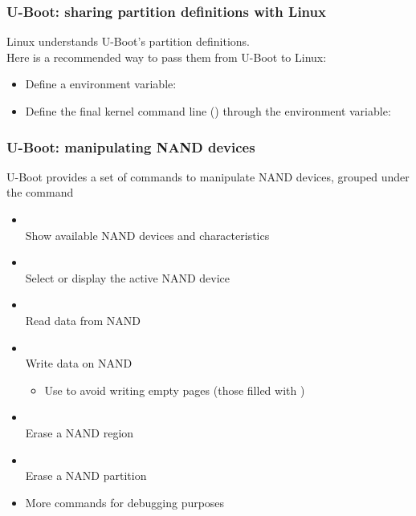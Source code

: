 \begin{frame}
  \frametitle{U-Boot: sharing partition definitions with Linux}
  Linux understands U-Boot's  partition definitions.\\
  Here is a recommended way to pass them from U-Boot to Linux:
  \begin{itemize}
  \item Define a  environment variable:\\
  \item Define the final kernel command line ()
    through the  environment variable:
  \end{itemize}
\end{frame}

\begin{frame}
  \frametitle{U-Boot: manipulating NAND devices}
  U-Boot provides a set of commands to manipulate NAND devices,
  grouped under the  command
  \begin{itemize}
  \item {}\\
    Show available NAND devices and characteristics
  \item {}\\
    Select or display the active NAND device
  \item {}\\
    Read data from NAND
  \item {}\\
    Write data on NAND
    \begin{itemize}
      \item Use  to avoid writing empty pages
      (those filled with )
    \end{itemize}
  \item {}\\
    Erase a NAND region
  \item {}\\
    Erase a NAND partition
  \item More commands for debugging purposes
  \end{itemize}
\end{frame}

